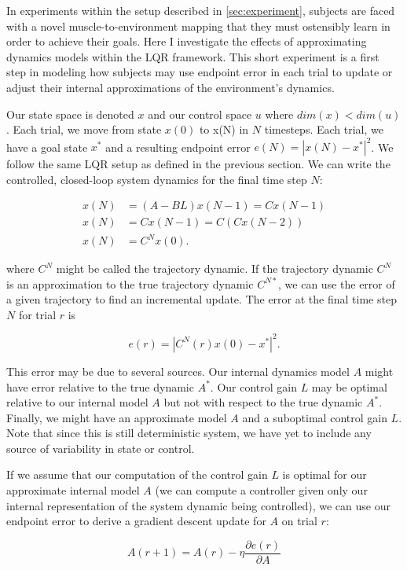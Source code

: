 \documentclass[
  a4paper,
]{article}
\begin{document}
In experiments within the setup described in \cref{sec:experiment},
subjects are faced with a novel muscle-to-environment mapping that they
must ostensibly learn in order to achieve their goals. Here I
investigate the effects of approximating dynamics models within the LQR
framework. This short experiment is a first step in modeling how
subjects may use endpoint error in each trial to update or adjust their
internal approximations of the environment's dynamics.

Our state space is denoted \(x\) and our control space \(u\) where
\(dim(x) < dim(u)\). Each trial, we move from state \(x(0)\) to x(N) in
\(N\) timesteps. Each trial, we have a goal state \(x^*\) and a
resulting endpoint error \(e(N) = |x(N) - x^*|^2\). We follow the same
LQR setup as defined in the previous section. We can write the
controlled, closed-loop system dynamics for the final time step \(N\):

\[
\begin{aligned}
x(N) &= (A - BL)x(N-1) = Cx(N-1) \\
x(N) &= Cx(N-1) = C(Cx(N-2)) \\
x(N) &= C^Nx(0).
\end{aligned}
\]

where \(C^N\) might be called the trajectory dynamic. If the trajectory
dynamic \(C^N\) is an approximation to the true trajectory dynamic
\(C^{N*}\), we can use the error of a given trajectory to find an
incremental update. The error at the final time step \(N\) for trial
\(r\) is

\[
e(r) = |C^N(r)x(0) - x^*|^2.
\]

This error may be due to several sources. Our internal dynamics model
\(A\) might have error relative to the true dynamic \(A^*\). Our control
gain \(L\) may be optimal relative to our internal model \(A\) but not
with respect to the true dynamic \(A^*\). Finally, we might have an
approximate model \(A\) and a suboptimal control gain \(L\). Note that
since this is still deterministic system, we have yet to include any
source of variability in state or control.

If we assume that our computation of the control gain \(L\) is optimal
for our approximate internal model \(A\) (we can compute a controller
given only our internal representation of the system dynamic being
controlled), we can use our endpoint error to derive a gradient descent
update for \(A\) on trial \(r\):

\[
A(r+1) = A(r) - \eta\frac{\partial{e(r)}}{\partial{A}}
\]
\end{document}
